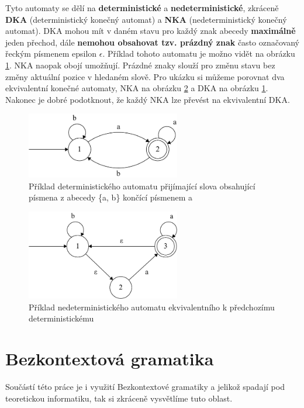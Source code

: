 Tyto automaty se dělí na \textbf{deterministické} a \textbf{nedeterministické}, zkráceně \textbf{DKA} (deterministický konečný automat) a \textbf{NKA} (nedeterministický konečný automat).
DKA mohou mít v daném stavu pro každý znak abecedy \textbf{maximálně} jeden přechod, dále \textbf{nemohou obsahovat tzv. prázdný znak} často označovaný řeckým písmenem epsilon $\epsilon$.
Příklad tohoto automatu je možno vidět na obrázku \ref{fig:DFAex}.
NKA naopak obojí umožňují. 
Prázdné znaky slouží pro změnu stavu bez změny aktuální pozice v hledaném slově. 
Pro ukázku si můžeme porovnat dva ekvivalentní konečné automaty,
NKA na obrázku \ref{fig:NFAex} a DKA na obrázku \ref{fig:DFAex}.
Nakonec je dobré podotknout, že každý NKA lze převést na ekvivalentní DKA.

\begin{figure}[!h]
	\centering
	\includegraphics[width=0.6\textwidth]{Figures/DFA_example.pdf}
	\caption{Příklad deterministického automatu přijímající slova obsahující písmena z abecedy \{a, b\} končící písmenem a}
	\label{fig:DFAex}
\end{figure}

\begin{figure}[!h]
	\centering
	\includegraphics[width=0.6\textwidth]{Figures/NFA_example.pdf}
	\caption{Příklad nedeterministického automatu ekvivalentního k předchozímu deterministickému}
	\label{fig:NFAex}
\end{figure}

\section{Bezkontextová gramatika}
Součástí této práce je i využití Bezkontextové gramatiky a jelikož spadají pod teoretickou informatiku, 
tak si zkráceně vysvětlíme tuto oblast.

